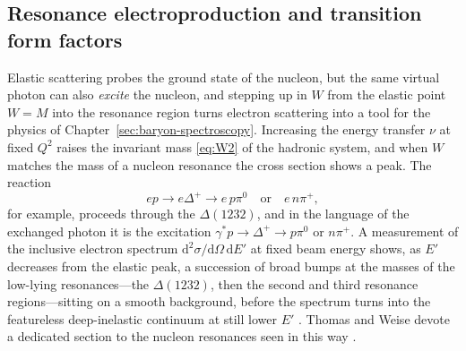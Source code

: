 \FloatBarrier

\subsection{Resonance electroproduction and transition form factors}
\label{subsec:transition-ff}

Elastic scattering probes the ground state of the nucleon, but the same virtual photon
can also \emph{excite} the nucleon, and stepping up in $W$ from the elastic point
$W=M$ into the resonance region turns electron scattering into a tool for the physics of
Chapter~\ref{sec:baryon-spectroscopy}. Increasing the energy transfer $\nu$ at fixed
$Q^{2}$ raises the invariant mass \eqref{eq:W2} of the hadronic system, and when $W$
matches the mass of a nucleon resonance the cross section shows a peak. The reaction
\begin{equation}
    ep \to e\Delta^{+} \to e\,p\pi^{0} \quad\text{or}\quad e\,n\pi^{+},
\end{equation}
for example, proceeds through the $\Delta(1232)$, and in the language of the exchanged
photon it is the excitation $\gamma^{*}p\to\Delta^{+}\to p\pi^{0}$ or $n\pi^{+}$. A
measurement of the inclusive electron spectrum $\mathrm{d}^{2}\sigma/\mathrm{d}\Omega\,
\mathrm{d}E'$ at fixed beam energy shows, as $E'$ decreases from the elastic peak, a
succession of broad bumps at the masses of the low-lying resonances---the
$\Delta(1232)$, then the second and third resonance regions---sitting on a smooth
background, before the spectrum turns into the featureless deep-inelastic continuum at
still lower $E'$ \cite[Ch.~14]{Amsler2018}. Thomas and Weise devote a dedicated section
to the nucleon resonances seen in this way \cite[Ch.~2.3]{ThomasWeise2001}.


